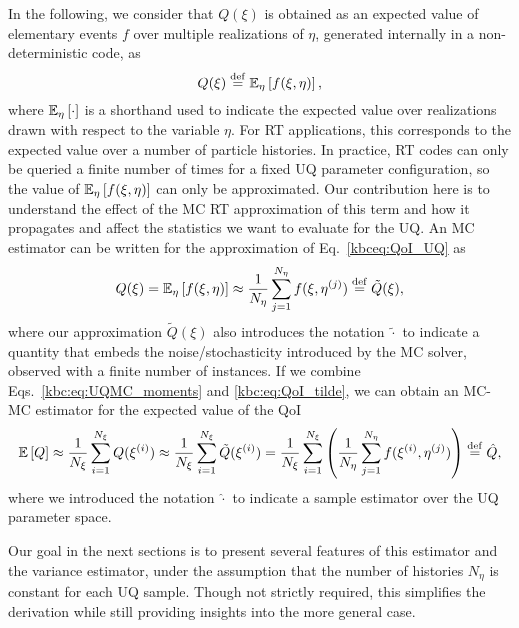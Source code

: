 In the following, we consider that $Q(\xi)$ is obtained as an expected value of elementary events $f$ over multiple realizations of $\eta$, generated internally in a non-deterministic code, as
\begin{equation}
\label{kbceq:QoI_UQ}
 Q(\xi) \overset{\operatorname{def}}{=} \mathbb{E}_\eta\left[ f(\xi,\eta) \right],
\end{equation}
where $\mathbb{E}_\eta\left[\cdot\right]$ is a shorthand used to indicate the expected value over realizations drawn with respect to the variable $\eta$. For RT applications, this corresponds to the expected value over a number of particle histories. In practice, RT codes can only be queried a finite number of times for a fixed UQ parameter configuration, so the value of $\mathbb{E}_\eta\left[ f(\xi,\eta) \right]$ can only be approximated. Our contribution here is to understand the effect of the MC RT approximation of this term and how it propagates and affect the statistics we want to evaluate for the UQ. An MC estimator can be written for the approximation of Eq.~\eqref{kbceq:QoI_UQ} as
\begin{equation}
\label{kbc:eq:QoI_tilde}
 Q(\xi) = \mathbb{E}_\eta\left[ f(\xi,\eta) \right] \approx \frac{1}{N_\eta} \sum_{j=1}^{N_\eta} f( \xi, \eta^{(j)} ) \overset{\operatorname{def}}{=} \tilde{Q}(\xi),
\end{equation}
where our approximation $\tilde{Q}(\xi)$ also introduces the notation $\tilde{\cdot}$ to indicate a quantity that embeds the noise/stochasticity introduced by the MC solver, observed with a finite number of instances. If we combine Eqs.~\eqref{kbc:eq:UQMC_moments} and \eqref{kbc:eq:QoI_tilde}, we can obtain an MC-MC estimator for the expected value of the QoI
\begin{equation}
 \label{eq:MC_MC_estimator}
 \mathbb{E}\left[Q\right] \approx \frac{1}{N_\xi} \sum_{i=1}^{N_\xi} Q( \xi^{(i)} ) \approx \frac{1}{N_\xi} \sum_{i=1}^{N_\xi} \tilde{Q}(\xi^{(i)})
                                                                   = \frac{1}{N_\xi} \sum_{i=1}^{N_\xi} \left( \frac{1}{N_\eta} \sum_{j=1}^{N_\eta} f( \xi^{(i)}, \eta^{(j)} ) \right)
                                                                   \overset{\operatorname{def}}{=} \hat{Q},
\end{equation}
where we introduced the notation $\hat{\cdot}$ to indicate a sample estimator over the UQ parameter space.

Our goal in the next sections is to present several features of this estimator and the variance estimator, under the assumption that the number of histories $N_\eta$ is constant for each UQ sample. Though not strictly required, this simplifies the derivation while still providing insights into the more general case. 


